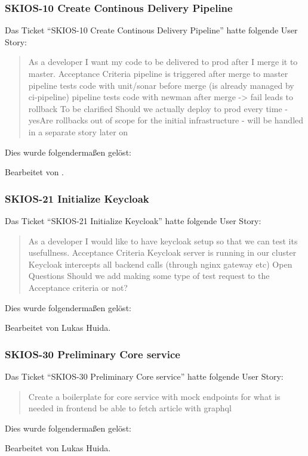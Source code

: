 \subsubsection{SKIOS-10 Create Continous Delivery Pipeline}
Das Ticket \enquote{SKIOS-10 Create Continous Delivery Pipeline} hatte folgende User Story:
\begin{quotation}
    As a developer I want my code to be delivered to prod after I merge it to master.
    Acceptance Criteria
    pipeline is triggered after merge to master
    pipeline tests code with unit/sonar before merge (is already managed by ci-pipeline)
    pipeline tests code with newman after merge -> fail leads to rollback
    To be clarified
    Should we actually deploy to prod every time - yesAre rollbacks out of scope for the initial infrastructure - will be handled in a separate story later on
\end{quotation}
Dies wurde folgendermaßen gelöst:
\begin{quotation}
    
\end{quotation}
Bearbeitet von .

\subsubsection{SKIOS-21 Initialize Keycloak}
Das Ticket \enquote{SKIOS-21 Initialize Keycloak} hatte folgende User Story:
\begin{quotation}
    As a developer I would like to have keycloak setup so that we can test its usefullness.
    Acceptance Criteria
    Keycloak server is running in our cluster
    Keycloak intercepts all backend calls (through nginx gateway etc)
    Open Questions
    Should we add making some type of test request to the Acceptance criteria or not?
\end{quotation}
Dies wurde folgendermaßen gelöst:
\begin{quotation}
    
\end{quotation}
Bearbeitet von Lukas Huida.

\subsubsection{SKIOS-30 Preliminary Core service}
Das Ticket \enquote{SKIOS-30 Preliminary Core service} hatte folgende User Story:
\begin{quotation}
    Create a boilerplate for core service with mock endpoints for what is needed in frontend
    be able to fetch article with graphql
\end{quotation}
Dies wurde folgendermaßen gelöst:
\begin{quotation}
    
\end{quotation}
Bearbeitet von Lukas Huida.

